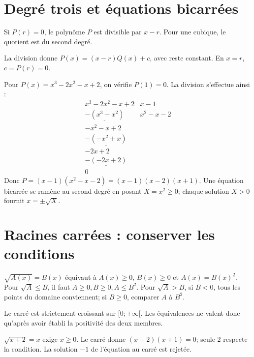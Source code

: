 \section{Degré trois et équations bicarrées}
\begin{propriete}Si $P(r)=0$, le polynôme $P$ est divisible par $x-r$. Pour une cubique, le quotient est du second degré.\end{propriete}
\begin{demonstration}La division donne $P(x)=(x-r)Q(x)+c$, avec reste constant. En $x=r$, $c=P(r)=0$.\end{demonstration}
\begin{exemple}
Pour $P(x)=x^3-2x^2-x+2$, on vérifie $P(1)=0$. La division s’effectue ainsi :
\[
\begin{array}{r|l}
x^3-2x^2-x+2&x-1\\
\underline{-(x^3-x^2)}&x^2-x-2\\
-x^2-x+2&\\
\underline{-(-x^2+x)}&\\
-2x+2&\\
\underline{-(-2x+2)}&\\
0&
\end{array}
\]
Donc $P=(x-1)(x^2-x-2)=(x-1)(x-2)(x+1)$. Une équation bicarrée se ramène au second degré en posant $X=x^2\ge0$; chaque solution $X>0$ fournit $x=\pm\sqrt X$.
\end{exemple}
\section{Racines carrées : conserver les conditions}
\begin{propriete}
$\sqrt{A(x)}=B(x)$ équivaut à $A(x)\ge0$, $B(x)\ge0$ et $A(x)=B(x)^2$.
Pour $\sqrt A\le B$, il faut $A\ge0,B\ge0,A\le B^2$.
Pour $\sqrt A>B$, si $B<0$, tous les points du domaine conviennent; si $B\ge0$, comparer $A$ à $B^2$.
\end{propriete}
\begin{demonstration}Le carré est strictement croissant sur $[0;+\infty[$. Les équivalences ne valent donc qu’après avoir établi la positivité des deux membres.\end{demonstration}
\begin{exemple}$\sqrt{x+2}=x$ exige $x\ge0$. Le carré donne $(x-2)(x+1)=0$; seule $2$ respecte la condition. La solution $-1$ de l’équation au carré est rejetée.\end{exemple}
